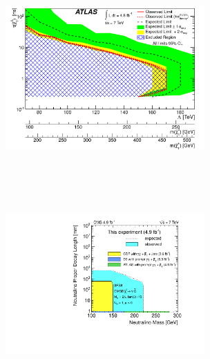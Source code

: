 \begin{center}
\centering
\mbox{\includegraphics[height=3.0in,width=3.0in]
{THESISPLOTS/ATLAS_Upper_Limit.png} \quad
\includegraphics[height=3.1in,width=3.0in]{THESISPLOTS/2D_exclusion.pdf}}
\label{fig:UpperLimits}
\end{center}


